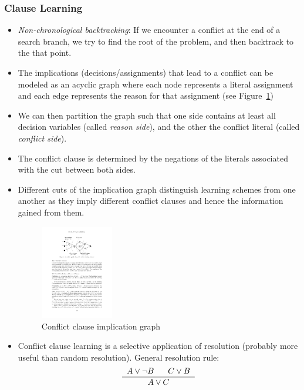 \subsubsection{Clause Learning}
\begin{itemize}
	\item \textit{Non-chronological backtracking}: If we encounter a conflict at the end of a search branch, we try to find the root of the problem, and then backtrack to the that point.
	\item The implications (decisions/assignments) that lead to a conflict can be modeled as an acyclic graph where each node represents a literal assignment and each edge represents the reason for that assignment (see Figure~\ref{fig:kr_sat_conflict_clause_figure})
	\item We can then partition the graph such that one side contains at least all decision variables (called \textit{reason side}), and the other the conflict literal (called \textit{conflict side}). 
	\item The conflict clause is determined by the negations of the literals associated with the cut between both sides. 
	\item Different cuts of the implication graph distinguish learning schemes from one another as they imply different conflict clauses and hence
	the information gained from them.
	\begin{figure}[ht!]
		\centering
		\includegraphics[width=0.3\textwidth]{figures/kr_sat_conflict_clause_figure.pdf}
		\caption{Conflict clause implication graph}
		\label{fig:kr_sat_conflict_clause_figure}
	\end{figure}
	\item Conflict clause learning is a selective application of resolution (probably more useful than random resolution). General resolution rule:
	$$\frac{\hspace{2mm}A\vee \lnot B\hspace{6mm}C\vee B\hspace{2mm}}{A\vee C}$$
\end{itemize}
